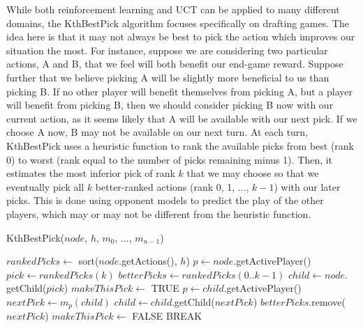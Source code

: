\documentclass[letterpaper]{article}
\numberwithin{equation}{section}
\numberwithin{theorem}{section}
\numberwithin{lemma}{section}
\numberwithin{df}{section}
\begin{document}
While both reinforcement learning and UCT can be applied to many different domains, the KthBestPick algorithm focuses specifically on drafting games.  The idea here is that it may not always be best to pick the action which improves our situation the most.  For instance, suppose we are considering two particular actions, A and B, that we feel will both benefit our end-game reward.  Suppose further that we believe picking A will be slightly more beneficial to us than picking B.  If no other player will benefit themselves from picking A, but a player will benefit from picking B, then we should consider picking B now with our current action, as it seems likely that A will be available with our next pick.  If we choose A now, B may not be available on our next turn.  At each turn, KthBestPick uses a heuristic function to rank the available picks from best (rank 0) to worst (rank equal to the number of picks remaining minus 1).  Then, it estimates the most inferior pick of rank $k$ that we may choose so that we eventually pick all $k$ better-ranked actions (rank 0, 1, ..., $k-1$) with our later picks.  This is done using opponent models to predict the play of the other players, which may or may not be different from the heuristic function.

\begin{algorithm}
	\caption{KthBestPick($node$, $h$, $m_0$, ..., $m_{n-1}$)}
	\label{alg:kth}
	\begin{algorithmic}[1]
		\STATE $rankedPicks \gets $ sort($node$.getActions(), $h$)
		\STATE $p \gets node$.getActivePlayer()
			\STATE $pick \gets rankedPicks(k)$
			\STATE $betterPicks \gets rankedPicks(0..k-1)$
			\STATE $child \gets node.$getChild($pick$)
			\STATE $makeThisPick \gets $ TRUE
				\STATE $p \gets child$.getActivePlayer()
				\STATE $nextPick \gets m_p(child)$
				\STATE $child \gets child.$getChild($nextPick$)
						\STATE $betterPicks.$remove($nextPick$)
					\ELSE
						\STATE $makeThisPick \gets $ FALSE
						\STATE BREAK
					\ENDIF
				\ENDIF
			\ENDWHILE
			\ENDIF
		\ENDFOR
	\end{algorithmic}
\end{algorithm}
\end{document}
